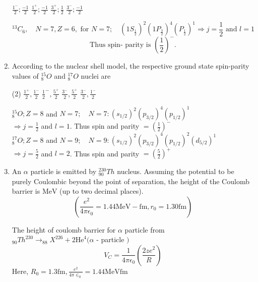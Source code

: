 \begin{enumerate}
\begin{tasks}
	\task[\textbf{A.}] $\frac{1^{-}}{2} ; \frac{-1}{2}$
	\task[\textbf{B.}]$\frac{1^{+}}{2} ; \frac{-1}{2}$
	\task[\textbf{C.}] $\frac{3^{+}}{2} ; \frac{1}{2}$
	\task[\textbf{D.}]$\frac{3^{-}}{2} ; \frac{-1}{2}$
\end{tasks}
\begin{answer}
	$$
	{ }^{13} C_{6}, \quad N=7, Z=6, \text { for } N=7 ; \quad\left(1 S_{\frac{1}{2}}\right)^{2}\left(1 P_{\frac{3}{2}}\right)^{4}\left(P_{\frac{1}{2}}\right)^{1} \Rightarrow j=\frac{1}{2} \text { and } l=1
	$$
	$$
	\text { Thus spin- parity is }\left(\frac{1}{2}\right)^{-} \text {. }
	$$
\end{answer}
\item According to the nuclear shell model, the respective ground state spin-parity values of ${ }_{8}^{15} O$ and ${ }_{8}^{17} O$ nuclei are
{}
\begin{tasks}(2)
	\task[\textbf{A.}] $\frac{1^{+}}{2}, \frac{1^{-}}{2}$
	\task[\textbf{B.}]$\frac{1}{2}^{-}, \frac{5^{+}}{2}$
	\task[\textbf{C.}]$\frac{3^{-}}{2}, \frac{5^{+}}{2}$
	\task[\textbf{D.}]$\frac{3^{-}}{2}, \frac{1^{-}}{2}$
\end{tasks}
\begin{answer}
	${ }_{8}^{15} O ; Z=8$ and $N=7 ; \quad N=7:\left(s_{1 / 2}\right)^{2}\left(p_{3 / 2}\right)^{4}\left(p_{1 / 2}\right)^{1}$\\
	$\Rightarrow j=\frac{1}{2}$ and $l=1$. Thus spin and parity $=\left(\frac{1}{2}\right)^{-}$\\
	${ }_{8}^{17} O ; Z=8$ and $N=9 ; \quad N=9:\left(s_{1 / 2}\right)^{2}\left(p_{3 / 2}\right)^{4}\left(p_{1 / 2}\right)^{2}\left(d_{5 / 2}\right)^{1}$\\
	 $\Rightarrow j=\frac{5}{2}$ and $l=2$. Thus spin and parity $=\left(\frac{5}{2}\right)^{+}$
\end{answer}
\item An $\alpha$ particle is emitted by ${ }_{90}^{230} T h$ nucleus. Assuming the potential to be purely Coulombic beyond the point of separation, the height of the Coulomb barrier is $\mathrm{MeV}$ (up to two decimal places).
$$
\left(\frac{e^{2}}{4 \pi \epsilon_{0}}=1.44 \mathrm{MeV}-\mathrm{fm}, r_{0}=1.30 \mathrm{fm}\right)
$$
{}
\begin{answer}
The height of coulomb barrier for $\alpha$ particle from \\
${ }_{90} T h^{230} \rightarrow_{88} X^{226}+2 \mathrm{He}^{4}(\alpha$ - particle $)$
$$
V_{C}=\frac{1}{4 \pi \epsilon_{0}}\left(\frac{2 z e^{2}}{R}\right)
$$
Here, $R_{0}=1.3 \mathrm{fm}, \frac{e^{2}}{4 \pi \in_{0}}=1.44 \mathrm{MeV} \mathrm{fm}$

\end{answer}
\end{enumerate}
